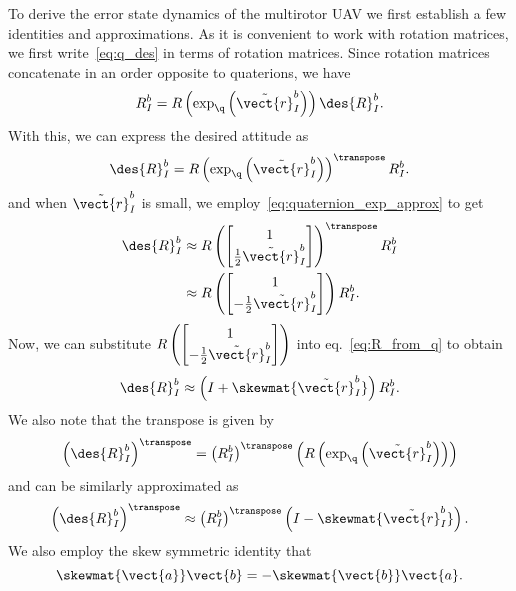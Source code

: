 
To derive the error state dynamics of the multirotor UAV we first establish a few
identities and approximations. As it is convenient to work with rotation
matrices, we first write~\eqref{eq:q_des} in terms of rotation matrices. Since 
rotation matrices concatenate in an order opposite to quaterions, we have
\begin{equation}
  R_{I}^{b} = R\left(\exp_{\q}\left(\tilde{\vect{r}}_{I}^{b}\right)\right)
  \des{R}_{I}^{b}.
\end{equation}
With this, we can express the desired attitude as
\begin{equation}
  \des{R}_{I}^{b} =
  R\left(\exp_{\q}\left(\tilde{\vect{r}}_{I}^{b}\right)\right)^\transpose R_{I}^{b}.
\end{equation}
and when $\tilde{\vect{r}}_I^b$ is small, we employ~\eqref{eq:quaternion_exp_approx} to get
\begin{align}
  \des{R}_{I}^{b} &\approx R\left(
  \begin{bmatrix}1\\\frac{1}{2}\tilde{\vect{r}}_I^b\end{bmatrix}
\right)^\transpose R_{I}^{b} \\
  \phantom{\des{R}_{I}^{b}} &\approx R\left(
  \begin{bmatrix}1\\-\frac{1}{2}\tilde{\vect{r}}_I^b\end{bmatrix}
\right) R_{I}^{b}.
\end{align}
Now, we can substitute $R\left( \begin{bmatrix}1\\-\frac{1}{2}\tilde{\vect{r}}_I^b\end{bmatrix} \right)$ into eq.~\eqref{eq:R_from_q} to obtain
\begin{equation}
  \des{R}_{I}^{b} \approx \left( I + \skewmat{\tilde{\vect{r}}_I^b} \right)
  R_{I}^{b}.
\end{equation}
We also note that the transpose is given by
\begin{equation}
  \left(\des{R}_{I}^{b}\right)^\transpose =
  \left(R_{I}^{b}\right)^\transpose
  \left(R\left(\exp_{\q}\left(\tilde{\vect{r}}_{I}^{b}\right)\right)\right)
\end{equation}
and can be similarly approximated as
\begin{equation}
  \left(\des{R}_{I}^{b}\right)^\transpose \approx
  \left(R_{I}^{b}\right)^\transpose \left( I - \skewmat{\tilde{\vect{r}}_I^b}
  \right).
\end{equation}
We also employ the skew symmetric identity that
\begin{equation}
  \skewmat{\vect{a}} \vect{b} = -\skewmat{\vect{b}} \vect{a}.
\end{equation}

